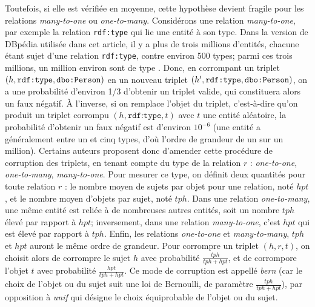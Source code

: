 Toutefois, si elle est vérifiée en moyenne, cette hypothèse devient fragile pour les relations \textit{many-to-one} ou \textit{one-to-many}. Considérons une relation \textit{many-to-one}, par exemple la relation \texttt{rdf:type} qui lie une entité à son type. Dans la version de DBpédia utilisée dans cet article, il y a plus de trois millions d'entités, chacune étant sujet d'une relation \texttt{rdf:type}, contre environ 500 types; parmi ces trois millions, un million environ sont de type . Donc, en corrompant un triplet $(h, \texttt{rdf:type}, \texttt{dbo:Person})$ en un nouveau triplet $(h', \texttt{rdf:type}, \texttt{dbo:Person})$, on a une probabilité d'environ 1/3 d'obtenir un triplet valide, qui constituera alors un faux négatif. À l'inverse, si on remplace l'objet du triplet, c'est-à-dire qu'on produit un triplet corrompu  $(h, \texttt{rdf:type}, t)$ avec $t$ une entité aléatoire, la probabilité d'obtenir un faux négatif est d'environ $10^{-6}$ (une entité a généralement entre un et cinq types, d'où l'ordre de grandeur de un sur un million).
Certains auteurs proposent donc d'amender cette procédure de corruption des triplets, en tenant compte du type de la relation $r$ : \textit{one-to-one}, \textit{one-to-many}, \textit{many-to-one}. Pour mesurer ce type, on définit deux quantités pour toute relation $r$ : le nombre moyen de sujets par objet pour une relation, noté $hpt$, et le nombre moyen d'objets par sujet, noté $tph$. Dans une relation \textit{one-to-many}, une même entité est reliée à de nombreuses autres entités, soit un nombre $tph$ élevé par rapport à $hpt$; inversement, dans une relation \textit{many-to-one}, c'est $hpt$ qui est élevé par rapport à $tph$. Enfin, les relations \textit{one-to-one} et \textit{many-to-many}, $tph$ et $hpt$ auront le même ordre de grandeur. Pour corrompre un triplet $(h, r, t)$, on choisit alors de corrompre le sujet $h$ avec probabilité $\frac{tph}{tph + hpt}$, et de corrompore l'objet $t$ avec probabilité $\frac{hpt}{tph + hpt}$. Ce mode de corruption est appellé \textit{bern} (car le choix de l'objet ou du sujet suit une loi de Bernoulli, de paramètre $\frac{tph}{tph + hpt}$), par opposition à \textit{unif} qui désigne le choix équiprobable de l'objet ou du sujet.

